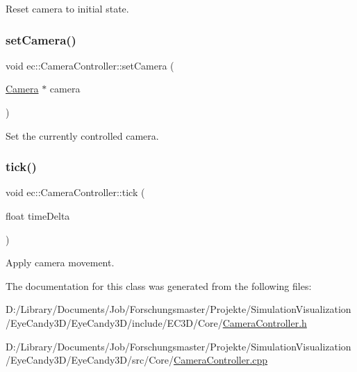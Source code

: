 Reset camera to initial state. 

\mbox{\label{classec_1_1_camera_controller_a74d3b80913b69dce0bae61a651c3b49b}} 
\subsubsection{\texorpdfstring{set\+Camera()}{setCamera()}}
{\footnotesize\ttfamily void ec\+::\+Camera\+Controller\+::set\+Camera (\begin{DoxyParamCaption}\item[{\mbox{\hyperlink{classec_1_1_camera}{Camera}} $\ast$}]{camera }\end{DoxyParamCaption})}



Set the currently controlled camera. 

\mbox{\label{classec_1_1_camera_controller_a82055ad6c8797937a8ec17234ab08758}} 
\subsubsection{\texorpdfstring{tick()}{tick()}}
{\footnotesize\ttfamily void ec\+::\+Camera\+Controller\+::tick (\begin{DoxyParamCaption}\item[{float}]{time\+Delta }\end{DoxyParamCaption})}



Apply camera movement. 



The documentation for this class was generated from the following files\+:\begin{DoxyCompactItemize}
\item 
D\+:/\+Library/\+Documents/\+Job/\+Forschungsmaster/\+Projekte/\+Simulation\+Visualization/\+Eye\+Candy3\+D/\+Eye\+Candy3\+D/include/\+E\+C3\+D/\+Core/\mbox{\hyperlink{_camera_controller_8h}{Camera\+Controller.\+h}}\item 
D\+:/\+Library/\+Documents/\+Job/\+Forschungsmaster/\+Projekte/\+Simulation\+Visualization/\+Eye\+Candy3\+D/\+Eye\+Candy3\+D/src/\+Core/\mbox{\hyperlink{_camera_controller_8cpp}{Camera\+Controller.\+cpp}}\end{DoxyCompactItemize}
